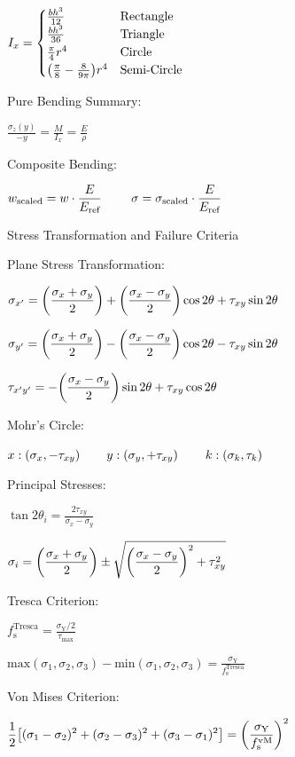 \documentclass[10pt]{article}
\makeatletter
\newcommand{\ds}{\displaystyle}
\newcommand{\tab}{\hspace{.02\textwidth}}
\newcommand{\twoEqn}[4]{$\makebox[#3][l]{$#1$} \makebox[#4][l]{$#2$}$}
\newcommand{\threeEqn}[6]{$\makebox[#4][l]{$#1$} \makebox[#5][l]{$#2$} \makebox[#6][l]{$#3$}$}
\newcommand{\lrb}[1]{\left(#1\right)}
\newcommand{\sqb}[1]{\left[#1\right]}
\let\originalleft\left
\let\originalright\right
\renewcommand{\left}{\mathopen{}\mathclose\bgroup\originalleft}
\renewcommand{\right}{\aftergroup\egroup\originalright}
\renewcommand{\section}{\@startsection{section}{1}{0ex}
                                {-2ex}
                                {0.7ex}
                                {\normalfont\large\bfseries}}
\renewcommand{\max}{\text{max}}
\renewcommand{\min}{\text{min}}
\newcommand{\Y}{\text{Y}}
\newcommand{\s}{\text{s}}
\newcommand{\Tresca}{\text{Tresca}}
\newcommand{\vM}{\text{vM}}
\makeatother
\begin{document}
\begin{multicols*}{3}
\tab $\ds I_x=\begin{cases}
    \frac{bh^3}{12} & \text{Rectangle} \\
    \frac{bh^3}{36} & \text{Triangle} \\
    \frac\pi 4r^4 & \text{Circle} \\
    \lrb{\frac\pi 8-\frac{8}{9\pi}}r^4 & \text{Semi-Circle}
\end{cases}$

Pure Bending Summary:

\tab $\ds\frac{\sigma_z(y)}{-y}=\frac{M}{I_x}=\frac{E}{\rho}$

Composite Bending:

\tab\twoEqn{\ds w_{\text{scaled}}=w\cdot\frac{E}{E_\text{ref}}}{\ds\sigma=\sigma_{\text{scaled}}\cdot\frac{E}{E_\text{ref}}}{10em}{10em}

\section{Stress Transformation and Failure Criteria}

Plane Stress Transformation:

\tab $\ds\sigma_{x'}=\lrb{\frac{\sigma_x+\sigma_y}{2}}+\lrb{\frac{\sigma_x-\sigma_y}{2}}\cos 2\theta+\tau_{xy}\sin 2\theta$

\tab $\ds\sigma_{y'}=\lrb{\frac{\sigma_x+\sigma_y}{2}}-\lrb{\frac{\sigma_x-\sigma_y}{2}}\cos 2\theta-\tau_{xy}\sin 2\theta$

\tab $\ds\tau_{x'y'}=-\lrb{\frac{\sigma_x-\sigma_y}{2}}\sin 2\theta+\tau_{xy}\cos 2\theta$

Mohr's Circle:

\tab\threeEqn{x: (\sigma_x,-\tau_{xy})}{y: (\sigma_y,+\tau_{xy})}{k: (\sigma_k,\tau_k)}{8em}{8em}{5em}

Principal Stresses:

\tab $\ds\tan 2\theta_i=\frac{2\tau_{xy}}{\sigma_x-\sigma_y}$

\tab $\ds\sigma_i=\lrb{\frac{\sigma_x+\sigma_y}{2}}\pm\sqrt{\lrb{\frac{\sigma_x-\sigma_y}{2}}^2+\tau_{xy}^2}$

Tresca Criterion:

\tab $\ds f_\s^\Tresca=\frac{\sigma_\Y/2}{\tau_\max}$

\tab $\ds\max(\sigma_1,\sigma_2,\sigma_3)-\min(\sigma_1,\sigma_2,\sigma_3)=\frac{\sigma_\Y}{f_\s^\Tresca}$

Von Mises Criterion:

\tab $\ds\frac 12\sqb{(\sigma_1-\sigma_2)^2+(\sigma_2-\sigma_3)^2+(\sigma_3-\sigma_1)^2}=\lrb{\frac{\sigma_\Y}{f_\s^\vM}}^2$


\end{multicols*}
\end{document}
